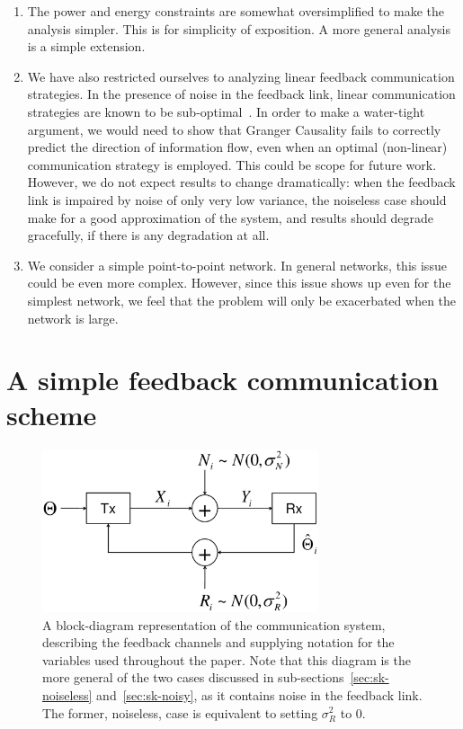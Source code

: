 \documentclass[letterpaper, 10pt, conference]{ieeeconf}
\begin{document}
\begin{enumerate}
	\item The power and energy constraints are somewhat oversimplified to make the analysis simpler. This is for simplicity of exposition. A more general analysis is a simple extension.
	\item We have also restricted ourselves to analyzing linear feedback communication strategies. In the presence of noise in the feedback link, linear communication strategies are known to be sub-optimal~\cite{YoungHanKimPaper}. In order to make a water-tight argument, we would need to show that Granger Causality fails to correctly predict the direction of information flow, even when an optimal (non-linear) communication strategy is employed. This could be scope for future work. However, we do not expect results to change dramatically: when the feedback link is impaired by noise of only very low variance, the noiseless case should make for a good approximation of the system, and results should degrade gracefully, if there is any degradation at all.
	\item We consider a simple point-to-point network. In general networks, this issue could be even more complex. However, since this issue shows up even for the simplest network, we feel that the problem will only be exacerbated when the network is large.
\end{enumerate}



\section{A simple feedback communication scheme}
\label{sec:sk}

\begin{figure}[htbp] %
	\centering
	\includegraphics[width=3.2in]{sk-block-diagram}
	\caption{A block-diagram representation of the communication system, describing the feedback channels and supplying notation for the variables used throughout the paper. Note that this diagram is the more general of the two cases discussed in sub-sections~\ref{sec:sk-noiseless} and~\ref{sec:sk-noisy}, as it contains noise in the feedback link. The former, noiseless, case is equivalent to setting $\sigma_R^2$ to 0.}
	\label{fig:sk-block-diagram}
\end{figure}
\end{document}
